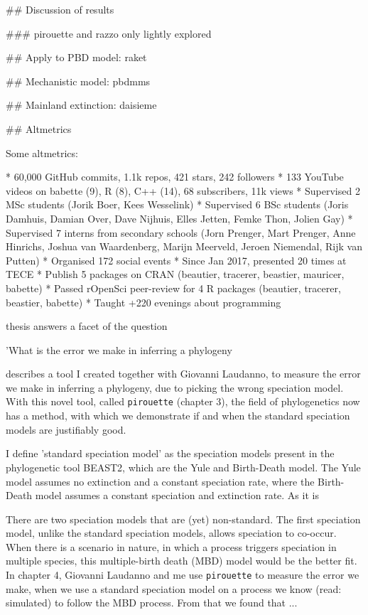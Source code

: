 ## Discussion of results

### pirouette and razzo only lightly explored


## Apply to PBD model: raket

## Mechanistic model: pbdmms

## Mainland extinction: daisieme

## Altmetrics

Some altmetrics:

 * 60,000 GitHub commits, 1.1k repos, 421 stars, 242 followers
 * 133 YouTube videos on babette (9), R (8), C++ (14), 68 subscribers, 11k views
 * Supervised 2 MSc students (Jorik Boer, Kees Wesselink)
 * Supervised 6 BSc students (Joris Damhuis, 
   Damian Over, Dave Nijhuis, Elles Jetten, Femke Thon, Jolien Gay)
 * Supervised 7 interns from secondary schools (Jorn Prenger, Mart Prenger, 
   Anne Hinrichs, Joshua van Waardenberg, Marijn Meerveld, Jeroen Niemendal, 
   Rijk van Putten)
 * Organised 172 social events
 * Since Jan 2017, presented 20 times at TECE
 * Publish 5 packages on CRAN (beautier, tracerer, beastier, mauricer, babette)
 * Passed rOpenSci peer-review for 4 R packages (beautier, tracerer, beastier, babette)
 * Taught +220 evenings about programming

 thesis answers a facet of the question 


'What is the error we make in inferring a phylogeny

describes a tool I created together with Giovanni Laudanno, 
to measure the error we make in inferring a phylogeny, due to
picking the wrong speciation model. 
With this novel tool, called \verb;pirouette; (chapter 3),
the field of phylogenetics now has a method, 
with which we demonstrate if and when the standard speciation models
are justifiably good. 

I define 'standard speciation model' as the speciation models 
present in the phylogenetic tool BEAST2, which are the Yule and
Birth-Death model. The Yule model assumes no extinction
and a constant speciation rate, where the Birth-Death model
assumes a constant speciation and extinction rate. As
it is 

There are two speciation models that are (yet) non-standard.
The first speciation model, 
unlike the standard speciation models, 
allows speciation to co-occur.
When there is a scenario in nature, in which a process triggers speciation
in multiple species, this multiple-birth death (MBD) model would be the better fit. 
In chapter 4, Giovanni Laudanno and me 
use \verb;pirouette; to 
measure the error we make, 
when we use a standard speciation model on a process we know (read: simulated) 
to follow the MBD process.
From that we found that ...

